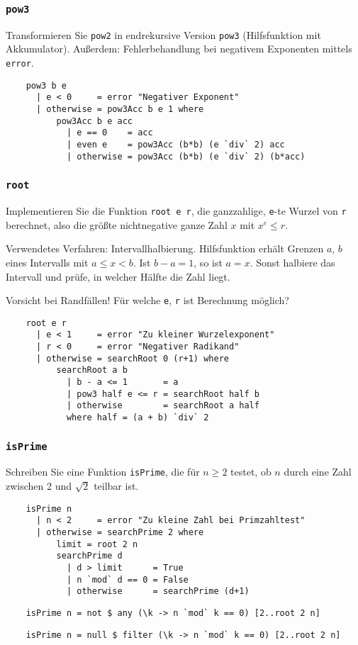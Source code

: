 \documentclass{beamer}
\begin{document}
\begin{frame}[fragile]
  \frametitle{\lstinline{pow3}}
  Transformieren Sie \lstinline{pow2} in endrekursive Version \lstinline{pow3} (Hilfsfunktion mit Akkumulator).
  Außerdem: Fehlerbehandlung bei negativem Exponenten mittels \lstinline{error}.
  \pause
  \begin{lstlisting}
    pow3 b e
      | e < 0     = error "Negativer Exponent"
      | otherwise = pow3Acc b e 1 where
          pow3Acc b e acc
            | e == 0    = acc
            | even e    = pow3Acc (b*b) (e `div` 2) acc
            | otherwise = pow3Acc (b*b) (e `div` 2) (b*acc)
  \end{lstlisting}
\end{frame}

\begin{frame}[fragile]
  \frametitle{\lstinline{root}}
  Implementieren Sie die Funktion \lstinline{root e r}, die ganzzahlige, \lstinline{e}-te Wurzel von \lstinline{r} berechnet,
  also die größte nichtnegative ganze Zahl $x$ mit $x^e \leq r$.
  
  Verwendetes Verfahren: Intervallhalbierung.
  Hilfsfunktion erhält Grenzen $a$, $b$ eines Intervalls mit $a \leq x < b$.
  Ist $b-a=1$, so ist $a=x$.
  Sonst halbiere das Intervall und prüfe, in welcher Hälfte die Zahl liegt.
  
  Vorsicht bei Randfällen!
  Für welche \lstinline{e}, \lstinline{r} ist Berechnung möglich?
  \pause
  \begin{lstlisting}
    root e r
      | e < 1     = error "Zu kleiner Wurzelexponent"
      | r < 0     = error "Negativer Radikand"
      | otherwise = searchRoot 0 (r+1) where
          searchRoot a b
            | b - a <= 1       = a
            | pow3 half e <= r = searchRoot half b
            | otherwise        = searchRoot a half
            where half = (a + b) `div` 2
  \end{lstlisting}
\end{frame}

\begin{frame}[fragile]
  \frametitle{\lstinline{isPrime}}
  Schreiben Sie eine Funktion \lstinline{isPrime}, die für $n \geq 2$ testet, ob $n$ durch eine Zahl zwischen 2 und $\sqrt{2}$ teilbar ist.
  \pause
  \begin{lstlisting}
    isPrime n
      | n < 2     = error "Zu kleine Zahl bei Primzahltest"
      | otherwise = searchPrime 2 where
          limit = root 2 n
          searchPrime d
            | d > limit      = True
            | n `mod` d == 0 = False
            | otherwise      = searchPrime (d+1)
  \end{lstlisting}
  \pause
  \begin{lstlisting}
    isPrime n = not $ any (\k -> n `mod` k == 0) [2..root 2 n]
  \end{lstlisting}
  \pause
  \begin{lstlisting}
    isPrime n = null $ filter (\k -> n `mod` k == 0) [2..root 2 n]
  \end{lstlisting}
\end{frame}
\end{document}
